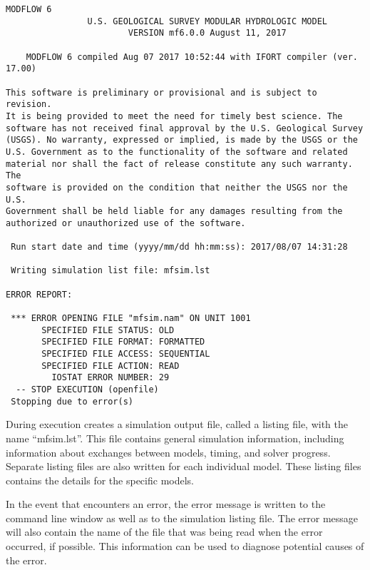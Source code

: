 {\small
\begin{lstlisting}[style=modeloutput]
                                   MODFLOW 6
                U.S. GEOLOGICAL SURVEY MODULAR HYDROLOGIC MODEL
                        VERSION mf6.0.0 August 11, 2017

    MODFLOW 6 compiled Aug 07 2017 10:52:44 with IFORT compiler (ver. 17.00)

This software is preliminary or provisional and is subject to revision.
It is being provided to meet the need for timely best science. The
software has not received final approval by the U.S. Geological Survey
(USGS). No warranty, expressed or implied, is made by the USGS or the
U.S. Government as to the functionality of the software and related
material nor shall the fact of release constitute any such warranty. The
software is provided on the condition that neither the USGS nor the U.S.
Government shall be held liable for any damages resulting from the
authorized or unauthorized use of the software.

 Run start date and time (yyyy/mm/dd hh:mm:ss): 2017/08/07 14:31:28

 Writing simulation list file: mfsim.lst

ERROR REPORT:

 *** ERROR OPENING FILE "mfsim.nam" ON UNIT 1001
       SPECIFIED FILE STATUS: OLD
       SPECIFIED FILE FORMAT: FORMATTED
       SPECIFIED FILE ACCESS: SEQUENTIAL
       SPECIFIED FILE ACTION: READ
         IOSTAT ERROR NUMBER: 29
  -- STOP EXECUTION (openfile)
 Stopping due to error(s)
\end{lstlisting}
}

During execution \mf creates a simulation output file, called a listing file, with the name ``mfsim.lst''.  This file contains general simulation information, including information about exchanges between models, timing, and solver progress.  Separate listing files are also written for each individual model.  These listing files contains the details for the specific models.

In the event that \mf encounters an error, the error message is written to the command line window as well as to the simulation listing file.  The error message will also contain the name of the file that was being read when the error occurred, if possible.  This information can be used to diagnose potential causes of the error.  
